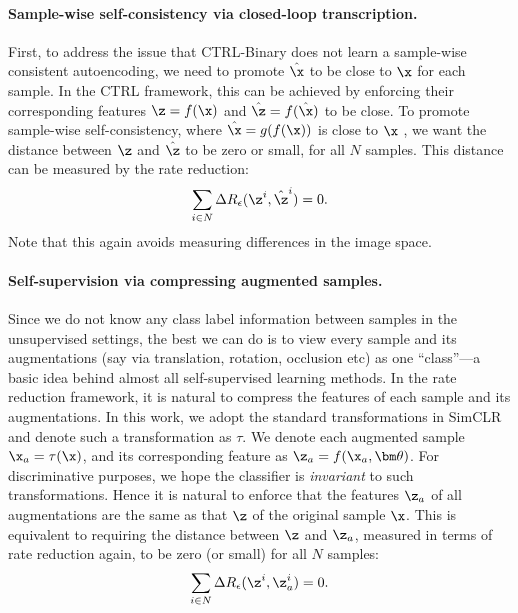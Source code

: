 \documentclass[../../book-main.tex]{subfiles}
\begin{document}
\paragraph{Sample-wise self-consistency via closed-loop transcription.} 
First, to address the issue that CTRL-Binary does not learn a sample-wise consistent autoencoding, we need to promote $\hat \x$ to be close to $\x$ for each sample. In the CTRL framework, this can be achieved by enforcing their corresponding features $\z=f(\x)$ and $\hat \z = f(\hat \x)$ to be close. 
To promote sample-wise self-consistency, where $\hat{\x} = g(f(\x))$ is close to $\x$ , we want the distance between $\z$ and $\hat{\z}$ to be zero or small, for all $N$ samples.
This distance can be measured by the rate reduction:
\begin{align}
\sum_{i\in N} \Delta R_\epsilon(\z^i,\hat{\z}^i) = 0.
\label{eqn:sample-self-consistency}\vspace{-2mm}
\end{align}
Note that this again avoids measuring differences in the image space.

\paragraph{Self-supervision via compressing augmented samples.} 
Since we do not know any class label information between samples in the unsupervised settings, the best we can do is to view every sample and its augmentations (say via translation, rotation,  occlusion etc) as one ``class''---a basic idea behind almost all self-supervised learning methods. In the rate reduction framework, it is natural to compress the features of each sample and its augmentations. In this work, we adopt the standard transformations in SimCLR \cite{chen2020simple} and denote such a transformation as $\tau$. We denote each augmented sample $\x_a = \tau(\x)$, and its corresponding feature as $\z_a = f(\x_a, \bm \theta) $. For discriminative purposes, we hope the classifier is {\em invariant} to such transformations. Hence it is natural to enforce that the features $\z_a$ of all augmentations are the same as that $\z$ of the original sample $\x$. This is equivalent to requiring the distance between $\z$  and  $\z_a$, measured in terms of rate reduction again, to be zero (or small) for all $N$ samples: 
\begin{align}
\sum_{i\in N} \Delta R_\epsilon(\z^i,\z_{a}^i) = 0.
\label{eqn:sample-compression}\vspace{-3mm}
\end{align}
\end{document}
